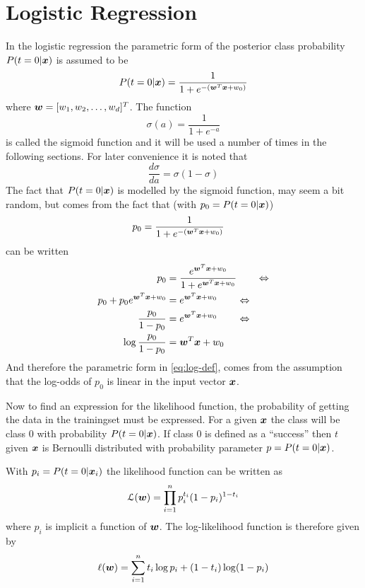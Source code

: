 \section{Logistic Regression}
In the logistic regression the parametric form of the posterior class probability $P(t=0|\boldsymbol{x})$ is assumed to be
\begin{equation}\label{eq:log-def}
    P(t=0|\boldsymbol{x}) = \frac{1}{1+e^{-(\boldsymbol{w}^T\boldsymbol{x}+w_0)}}
\end{equation}
where $\boldsymbol{w}=[w_1, w_2, \dots, w_d]^T$. The function
\begin{equation}\label{eq:sigmoid}
    \sigma(a) = \frac{1}{1+e^{-a}}
\end{equation}
is called the sigmoid function and it will be used a number of times in the following sections. For later convenience it is noted that
\begin{equation}\label{eq:sigmoid-derivative}
    \frac{d\sigma}{da} = \sigma(1-\sigma)
\end{equation}
The fact that $P(t=0|\boldsymbol{x})$ is modelled by the sigmoid function, may seem a bit random, but comes from the fact that (with $p_0=P(t=0|\boldsymbol{x})$)
\begin{align*}
    p_0 &= \frac{1}{1+e^{-(\boldsymbol{w}^T\boldsymbol{x}+w_0)}} 
\end{align*}
can be written
\begin{align*}
    p_0 &= \frac{e^{\boldsymbol{w}^T\boldsymbol{x}+w_0}}{1+e^{\boldsymbol{w}^T\boldsymbol{x}+w_0}} \quad\quad\Leftrightarrow \\
    p_0 + p_0e^{\boldsymbol{w}^T\boldsymbol{x}+w_0} &= e^{\boldsymbol{w}^T\boldsymbol{x}+w_0} \quad\quad\Leftrightarrow \\
    \frac{p_0}{1-p_0} &= e^{\boldsymbol{w}^T\boldsymbol{x}+w_0} \quad\quad\Leftrightarrow \\
    \log \frac{p_0}{1-p_0} &= \boldsymbol{w}^T\boldsymbol{x}+w_0
\end{align*}
And therefore the parametric form in \eqref{eq:log-def}, comes from the assumption that the log-odds of $p_0$ is linear in the input vector $\boldsymbol{x}$. \par
Now to find an expression for the likelihood function, the probability of getting the data in the trainingset must be expressed. For a given $\boldsymbol{x}$ the class will be class 0 with probability $P(t=0|\boldsymbol{x})$. If class 0 is defined as a ``success'' then $t$ given $\boldsymbol{x}$ is Bernoulli distributed with probability parameter $p=P(t=0|\boldsymbol{x})$. \par
With $p_i=P(t=0|\boldsymbol{x}_i)$ the likelihood function can be written as
\[
    \mathcal{L}(\boldsymbol{w}) = \prod_{i=1}^n p_i^{t_i}(1-p_i)^{1-t_i}
\]
where $p_i$ is implicit a function of $\boldsymbol{w}$. The log-likelihood function is therefore given by
\begin{equation}\label{eq:log-like-logistic}
    \ell(\boldsymbol{w}) = \sum_{i=1}^n t_i\log p_i + (1-t_i)\log(1-p_i)
\end{equation}
